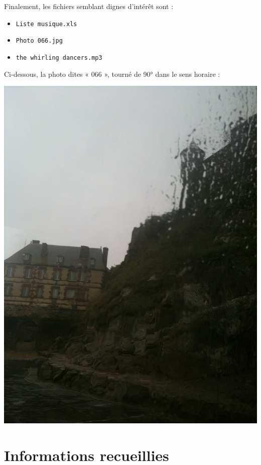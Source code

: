 \documentclass[a4paper,11pt]{article}
\begin{document}
Finalement, les fichiers semblant dignes d’intérêt sont :
\begin{itemize}
    \item {\tt Liste musique.xls}
    \item {\tt Photo 066.jpg}
    \item {\tt the whirling dancers.mp3}
\end{itemize}

Ci-dessous, la photo dites « 066 », tourné de 90° dans le sens horaire :

\includegraphics[width=\textwidth,angle=-90]{Photo-066.jpg}

\section{Informations recueillies}
\end{document}
